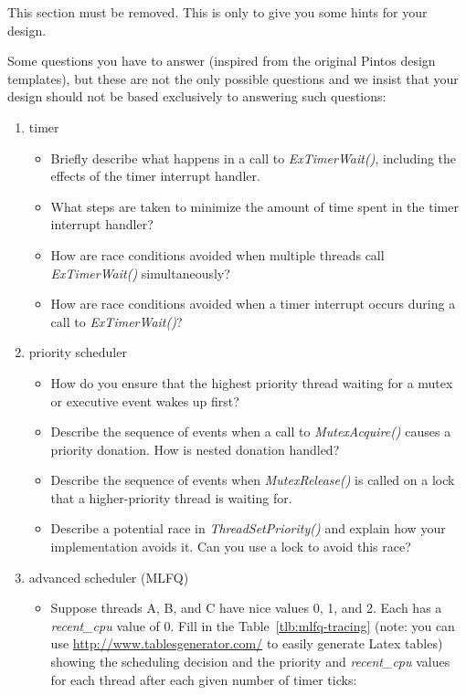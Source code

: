 This section must be removed. This is only to give you some hints for your design. 

Some questions you have to answer (inspired from the original Pintos design templates), but these are not the only possible questions and we insist that your design should not be based exclusively to answering such questions:\begin{enumerate}
    \item timer
        \begin{itemize}
            \item Briefly describe what happens in a call to \textit{ExTimerWait()}, including the effects of the timer interrupt handler.
            \item What steps are taken to minimize the amount of time spent in the timer interrupt handler?
            \item How are race conditions avoided when multiple threads call \textit{ExTimerWait()} simultaneously?
            \item How are race conditions avoided when a timer interrupt occurs during a call to \textit{ExTimerWait()}?
        \end{itemize}
    
    \item priority scheduler
        \begin{itemize}
            \item How do you ensure that the highest priority thread waiting for a mutex or executive event wakes up first?
    
            \item Describe the sequence of events when a call to \textit{MutexAcquire()} causes a priority donation.  How is nested donation handled?
            
            \item Describe the sequence of events when \textit{MutexRelease()} is called on a lock that a higher-priority thread is waiting for.
            
            \item Describe a potential race in \textit{ThreadSetPriority()} and explain how your implementation avoids it.  Can you use a lock to avoid this race?
        \end{itemize}

    \item advanced scheduler (MLFQ)
        \begin{itemize}
            \item Suppose threads A, B, and C have nice values 0, 1, and 2. Each has a \textit{recent\_cpu} value of 0.  Fill in the Table~\ref{tlb:mlfq-tracing}  (note: you can use \url{http://www.tablesgenerator.com/} to easily generate Latex tables) showing the scheduling decision and the priority and \textit{recent\_cpu} values for each thread after each given number of timer ticks:


\end{itemize}
\end{enumerate}
